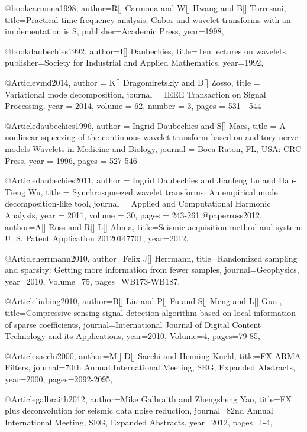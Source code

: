 {@book{carmona1998,
  author={R[] Carmona and W[] Hwang and B[] Torresani},
  title={Practical time-frequency analysis: Gabor and wavelet transforms with an implementation is S},
  publisher={Academic Press},
  year=1998,
}

@book{daubechies1992,
  author={I[] Daubechies},
  title={Ten lectures on wavelets},
  publisher={Society for Industrial and Applied Mathematics},
  year=1992,
}

@Article{vmd2014,
  author = 	 {K[] Dragomiretskiy and D[] Zosso},
  title = 	 {Variational mode decomposition},
  journal = 	 {IEEE Transaction on Signal Processing},
  year = 	 2014,
  volume = 62,
  number = 3,
  pages = 	 {531 - 544}
}

@Article{daubechies1996,
  author = 	 {Ingrid Daubechies and S[] Maes},
  title = 	 {A nonlinear squeezing of the continuous wavelet transform based on auditory nerve models Wavelets in Medicine and Biology},
  journal = 	 {Boca Raton, FL, USA: CRC Press},
  year = 	 1996,
  pages = 	 {527-546}
}

@Article{daubechies2011,
  author = 	 {Ingrid Daubechies and Jianfeng Lu and Hau-Tieng Wu},
  title = 	 {Synchrosqueezed wavelet transforms: An empirical mode decomposition-like tool},
  journal = 	 {Applied and Computational Harmonic Analysis},
  year = 	 2011,
  volume = 	 30,
  pages = 	 {243-261}
}
@paper{ross2012,
  author={A[] Ross and R[] L[] Abma},
  title={Seismic acquisition method and system: U. S. Patent Application
20120147701},
  year=2012,
}

@Article{herrmann2010,
  author={Felix J[] Herrmann},
  title={Randomized sampling and sparsity: Getting more information from fewer samples},
  journal={Geophysics},
  year=2010,
  Volume=75,
  pages={WB173-WB187},
}

@Article{liubing2010,
  author={B[] Liu and P[] Fu and S[] Meng and L[] Guo },
  title={Compressive sensing signal detection algorithm based on local information of sparse coefficients},
  journal={International Journal of Digital Content Technology and its Applications},
  year=2010,
  Volume=4,
  pages={79-85},
}


@Article{sacchi2000,
  author={M[] D[] Sacchi and Henning Kuehl},
  title={FX ARMA Filters},
  journal={70th Annual International Meeting, SEG, Expanded Abstracts},
  year=2000,
  pages={2092-2095},
}

@Article{galbraith2012,
  author={Mike Galbraith and Zhengsheng Yao},
  title={FX plus deconvolution for seismic data noise reduction},
  journal={82nd Annual International Meeting, SEG, Expanded Abstracts},
  year=2012,
  pages={1-4},
}

}
